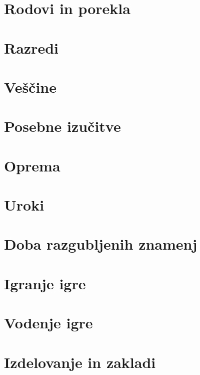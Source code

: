 \documentclass[10pt,a4paper,twocolumn,openany]{book}
\begin{document}
\newcommand{\oneaction}{♦}
\newcommand{\twoactions}{♦♦}
\newcommand{\threeactions}{♦♦♦}
\newcommand{\freeaction}{◇}
\newcommand{\reaction}{↺}

\frontmatter

\rpgMakeCover[
    image = img/cover,
    logo = img/logo,
    title = Stezosledec\\\Huge{Druga izdaja},
    subtitle = Osnovna pravila igre Pathfinder 2e\\Prevedel Grimpy
]



\tableofcontents



\chapter{Rodovi in porekla}

\chapter{Razredi}

\chapter{Veščine}

\chapter{Posebne izučitve}

\chapter{Oprema}

\chapter{Uroki}

\chapter{Doba razgubljenih znamenj}

\chapter{Igranje igre}

\chapter{Vodenje igre}

\chapter{Izdelovanje in zakladi}
\end{document}
